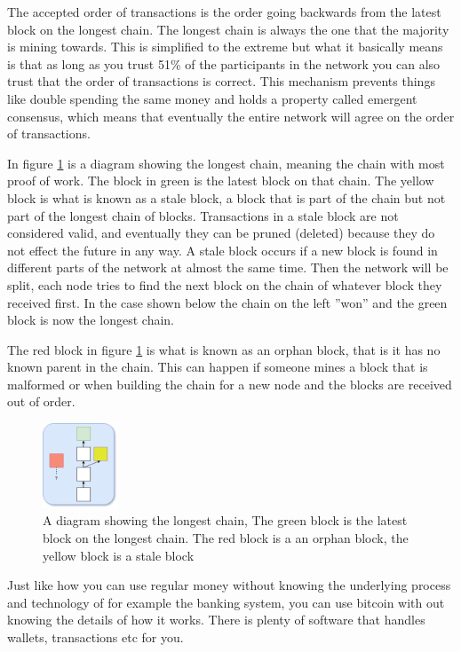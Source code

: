 The accepted order of transactions is the order going backwards from the latest block on the longest chain. The longest chain is always the one that the majority is mining towards. This is simplified to the extreme but what it basically means is that as long as you trust 51\% of the participants in the network you can also trust that the order of transactions is correct. This mechanism prevents things like double spending the same money and holds a property called emergent consensus, which means that eventually the entire network will agree on the order of transactions.

In figure \ref{fig:blockchain2} is a diagram showing the longest chain, meaning the chain with most proof of work. The block in green is the latest block on that chain. The yellow block is what is known as a stale block, a block that is part of the chain but not part of the longest chain of blocks. Transactions in a stale block are not considered valid, and eventually they can be pruned (deleted) because they do not effect the future in any way. A stale block occurs if a new block is found in different parts of the network at almost the same time. Then the network will be split, each node tries to find the next block on the chain of whatever block they received first. In the case shown below the chain on the left ''won'' and the green block is now the longest chain.

The red block in figure \ref{fig:blockchain2} is what is known as an orphan block, that is it has no known parent in the chain. This can happen if someone mines a block that is malformed or when building the chain for a new node and the blocks are received out of order.

\begin{figure}[H]
	\centering
	\includegraphics[width=0.2\textwidth]{introduction/images/more_blockchain.png}
	\caption{A diagram showing the longest chain, The green block is the latest block on the longest chain. The red block is a an orphan block, the yellow block is a stale block}
	\label{fig:blockchain2}
\end{figure}


Just like how you can use regular money without knowing the underlying process and technology of for example the banking system, you can use bitcoin with out knowing the details of how it works. There is plenty of software that handles wallets, transactions etc for you. 

